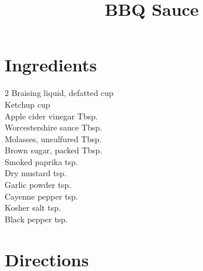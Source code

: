 \documentclass[11pt,letterpaper]{article}
\title{BBQ Sauce}
\author{}
\date{}
\begin{document}
\maketitle
\thispagestyle{empty}

\section*{Ingredients}
\setlength{\columnsep}{20pt}
\begin{multicols}{2}
\noindent
    Braising liquid, defatted  cup \\
    Ketchup \dotfill {} cup \\
    Apple cider vinegar  Tbsp. \\
    Worcestershire sauce  Tbsp. \\
    Molasses, unsulfured  Tbsp. \\
    \columnbreak
    Brown sugar, packed  Tbsp. \\
    Smoked paprika  tsp. \\
    Dry mustard \dotfill {} tsp. \\
    Garlic powder \dotfill {} tsp. \\
    Cayenne pepper \dotfill {} tsp. \\
    Kosher salt \dotfill {} tsp. \\
    Black pepper \dotfill {} tsp. \\
\end{multicols}

\section*{Directions}
\end{document}
